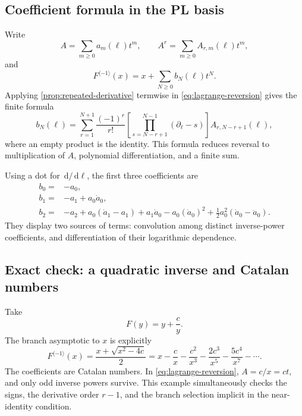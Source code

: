 \documentclass[11pt,oneside]{article}
\numberwithin{equation}{section}
\theoremstyle{definition}
\newcommand{\dlog}{\partial_{\ell}}
\newcommand{\rev}{\langle -1\rangle}
\newcommand{\dd}{\,\mathrm d}
\begin{document}
\subsection{Coefficient formula in the PL basis}

Write
\begin{equation}\label{eq:A-power-coefficients}
 A=\sum_{m\ge0}a_m(\ell)t^m,
 \qquad
 A^r=\sum_{m\ge0}A_{r,m}(\ell)t^m,
\end{equation}
and
\[
 F^{\rev}(x)=x+\sum_{N\ge0}b_N(\ell)t^N.
\]
Applying \cref{prop:repeated-derivative} termwise in
\eqref{eq:lagrange-reversion} gives the finite formula
\begin{equation}\label{eq:inverse-coefficient-formula}
\boxed{
 b_N(\ell)=
 \sum_{r=1}^{N+1}\frac{(-1)^r}{r!}
 \left[\prod_{s=N-r+1}^{N-1}(\dlog-s)\right]
 A_{r,N-r+1}(\ell),
}
\end{equation}
where an empty product is the identity.  This formula reduces reversal to
multiplication of \(A\), polynomial differentiation, and a finite sum.

Using a dot for \(\dd/\dd\ell\), the first three coefficients are
\begin{align}
 b_0={}&-a_0,\label{eq:b0}\\
 b_1={}&-a_1+a_0\dot a_0,\label{eq:b1}\\
 b_2={}&-a_2+a_0(\dot a_1-a_1)+a_1\dot a_0
       -a_0(\dot a_0)^2
       +\frac12a_0^2(\dot a_0-\ddot a_0).
       \label{eq:b2}
\end{align}
They display two sources of terms: convolution among distinct inverse-power
coefficients, and differentiation of their logarithmic dependence.

\subsection{Exact check: a quadratic inverse and Catalan numbers}

Take
\[
  F(y)=y+\frac{c}{y}.
\]
The branch asymptotic to \(x\) is explicitly
\begin{equation}\label{eq:quadratic-exact-inverse}
  F^{\rev}(x)=\frac{x+\sqrt{x^2-4c}}2
  =x-\frac{c}{x}-\frac{c^2}{x^3}
    -\frac{2c^3}{x^5}-\frac{5c^4}{x^7}-\cdots.
\end{equation}
The coefficients are Catalan numbers.  In
\eqref{eq:lagrange-reversion}, \(A=c/x=ct\), and only odd inverse powers survive.
This example simultaneously checks the signs, the derivative order \(r-1\), and
the branch selection implicit in the near-identity condition.
\end{document}

